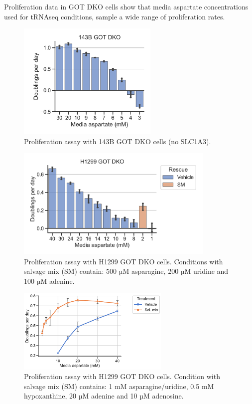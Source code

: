 \FloatBarrier
Proliferation data in GOT DKO cells show that media aspartate concentrations used for tRNAseq conditions, sample a wide range of proliferation rates.

\begin{figure}[ht]
    \centering
    \includegraphics[width=0.6\textwidth]{figures/sapp/tRNA/143B_DKO_asp-titr.pdf}
    \caption[Asp titration in 143B GOT DKO]{
    Proliferation assay with 143B GOT DKO cells (no SLC1A3).
    }
    \label{fig:sapp:tRNA:143B_DKO_asp_prlfr}
\end{figure}

\begin{figure}[ht]
    \centering
    \includegraphics[width=0.85\textwidth]{figures/sapp/tRNA/H1299_DKO_asp-titr.pdf}
    \caption[Asp titration in H1299 GOT DKO]{
    Proliferation assay with H1299 GOT DKO cells.
    Conditions with salvage mix (SM) contain: 500 µM asparagine, 200 µM uridine and 100 µM adenine.
    }
    \label{fig:sapp:tRNA:H1299_DKO_prlfr1}
\end{figure}

\begin{figure}[ht]
    \centering
    \includegraphics[width=0.65\textwidth]{figures/sapp/tRNA/H1299_GOT-DKO_prlfr.pdf}
    \caption[Asp titration in H1299 GOT DKO]{
    Proliferation assay with H1299 GOT DKO cells.
    Condition with salvage mix (SM) contains: 1 mM asparagine/uridine, 0.5 mM hypoxanthine, 20 µM adenine and 10 µM adenosine.
    }
    \label{fig:sapp:tRNA:H1299_DKO_prlfr2}
\end{figure}

